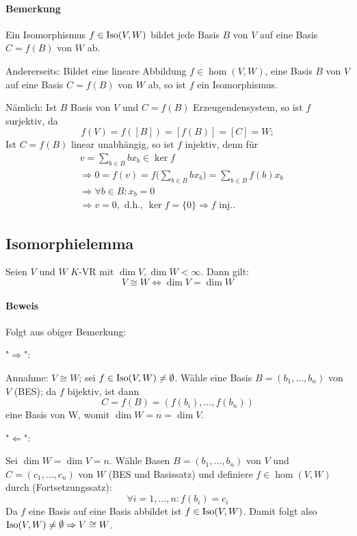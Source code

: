 \paragraph{Bemerkung}
	Ein Isomorphismus $f\in \operatorname{Iso}(V,W)$ bildet jede Basis $B$ von $V$ auf eine Basis $C = f(B)$ von $W$ ab.
	
	Andererseits: Bildet eine lineare Abbildung $f\in \hom(V,W)$, eine Basis $B$ von $V$ auf eine Basis $C = f(B)$ von $W$ ab, so ist $f$ ein Isomorphismus.
	
	Nämlich: Ist $B$ Basis von $V$ und $ C = f(B)$ Erzeugendensystem, so ist $f$ surjektiv, da
            \[f(V) = f ([B]) = [f(B)] = [C] = W;\]
	Ist $C =f(B)$ linear unabhängig, so ist $f$ injektiv, denn für
	\begin{align*}
		&v = \sum_{b\in B} bx_b \in \ker f\\
		&\Rightarrow 0 = f(v) = f\Big(\sum_{b\in B}bx_b\Big) = \sum_{b\in B}f(b)x_b\\
		&\Rightarrow \forall b \in B: x_b = 0 \\
		&\Rightarrow v = 0, \text{ d.h., } \ker f=\{{0}\} \Rightarrow f \text{ inj.}.
	\end{align*}
			
\subsection{Isomorphielemma}
	\begin{Lemma}[Isomorphielemma]
		Seien $V$ und $W$ $ K $-VR mit $\dim V, \dim W < \infty$.
                Dann gilt: 
                    \[V \cong W \Leftrightarrow \dim V = \dim W\]
	\end{Lemma}
	
\paragraph{Beweis}
	Folgt aus obiger Bemerkung:
		
	"$\Rightarrow$":
	
	Annahme: $V \cong W$; sei $f\in \operatorname{Iso}(V,W)\neq \emptyset$.
	Wähle eine Basis $B = (b_1, \dots, b_n)$ von $V$ (BES); da $f$ bijektiv, ist dann
                \[C = f(B) = (f(b_i), \dots , f(b_n))\]
	eine Basis von W, womit $\dim W = n = \dim V$.
	
	"$\Leftarrow$":
	
	Sei $\dim W = \dim V = n$.
	Wähle Basen $B = (b_1, \dots ,b_n)$ von $V$ und $C = (c_1, \dots ,c_n)$ von $W$ (BES und Basissatz) und definiere $f\in \hom(V,W)$ durch (Fortsetzungssatz):
		\[\forall i = 1, ... ,n : f(b_i) = c_i\]
	Da $f$ eine Basis auf eine Basis abbildet ist $f\in \operatorname{Iso}(V,W)$.
	Damit folgt also $\operatorname{Iso}(V,W) \neq \emptyset \Rightarrow V \cong W$.
			
